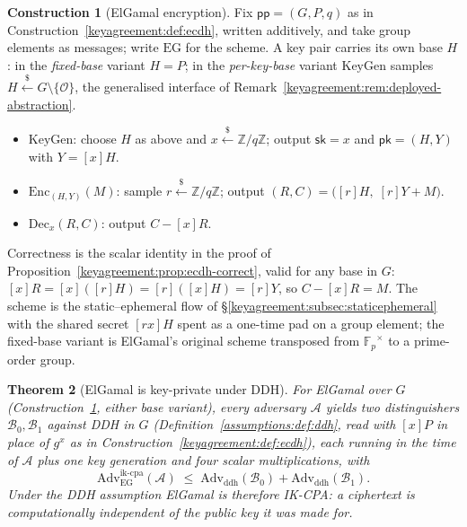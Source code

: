 \documentclass[11pt,a4paper]{article}
\newtheorem{theorem}{Theorem}[section]
\theoremstyle{definition}
\newtheorem{construction}[theorem]{Construction}
\theoremstyle{remark}
\newcommand{\Z}{\ensuremath{\mathbb{Z}}}
\newcommand{\Fp}{\ensuremath{\mathbb{F}_{p}}}
\begin{document}
\begin{construction}[ElGamal encryption]
\label{keyagreement:def:elgamal}
Fix \(\mathsf{pp} = (G, P, q)\) as in
Construction~\ref{keyagreement:def:ecdh}, written additively, and
take group elements as messages; write \(\mathrm{EG}\) for the
scheme. A key pair carries its own base \(H\): in the
\emph{fixed-base} variant \(H = P\); in the
\emph{per-key-base} variant \(\mathrm{KeyGen}\) samples
\(H \xleftarrow{\$} G \setminus \{\mathcal{O}\}\), the generalised
interface of Remark~\ref{keyagreement:rem:deployed-abstraction}.
\begin{itemize}
\item \(\mathrm{KeyGen}\): choose \(H\) as above and
  \(x \xleftarrow{\$} \Z/q\Z\); output \(\mathsf{sk} = x\) and
  \(\mathsf{pk} = (H, Y)\) with \(Y = [x]H\).
\item \(\mathrm{Enc}_{(H, Y)}(M)\): sample
  \(r \xleftarrow{\$} \Z/q\Z\); output
  \((R, C) = \bigl([r]H,\; [r]Y + M\bigr)\).
\item \(\mathrm{Dec}_{x}(R, C)\): output \(C - [x]R\).
\end{itemize}
Correctness is the scalar identity in the proof of
Proposition~\ref{keyagreement:prop:ecdh-correct}, valid for any base
in \(G\): \([x]R = [x]([r]H) = [r]([x]H) = [r]Y\), so
\(C - [x]R = M\). The scheme is the static--ephemeral flow of
\S\ref{keyagreement:subsec:staticephemeral} with the shared secret
\([rx]H\) spent as a one-time pad on a group element; the fixed-base
variant is ElGamal's original scheme transposed from
\(\Fp^{\times}\) to a prime-order group.
\end{construction}

\begin{theorem}[ElGamal is key-private under DDH]
\label{keyagreement:thm:ikcpa}
For ElGamal over \(G\) (Construction~\ref{keyagreement:def:elgamal},
either base variant), every adversary \(\mathcal{A}\) yields two
distinguishers \(\mathcal{B}_{0}, \mathcal{B}_{1}\) against DDH in
\(G\) (Definition~\ref{assumptions:def:ddh}, read with \([x]P\) in
place of \(g^{x}\) as in Construction~\ref{keyagreement:def:ecdh}),
each running in the time of \(\mathcal{A}\) plus one key generation
and four scalar multiplications, with
\[
\mathrm{Adv}^{\mathrm{ik\text{-}cpa}}_{\mathrm{EG}}(\mathcal{A})
\;\le\;
\mathrm{Adv}_{\mathrm{ddh}}(\mathcal{B}_{0})
+ \mathrm{Adv}_{\mathrm{ddh}}(\mathcal{B}_{1}).
\]
Under the DDH assumption ElGamal is therefore IK-CPA: a ciphertext is
computationally independent of the public key it was made for.
\end{theorem}
\end{document}
